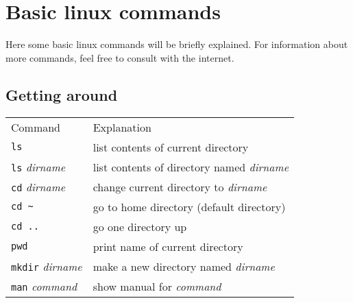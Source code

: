 \documentclass{article}
\begin{document}
\section{Basic linux commands}
Here some basic linux commands will be briefly explained.
For information about more commands, feel free to consult with the internet.

\subsection{Getting around}
\begin{tabular}{ll}
  Command & Explanation \\
  \hhline{==}
  \texttt{ls} & list contents of current directory \\
  \texttt{ls} \textit{dirname} & list contents of directory named \textit{dirname} \\
  \texttt{cd} \textit{dirname} & change current directory to \textit{dirname} \\
  \texttt{cd \textasciitilde} & go to home directory (default directory) \\
  \texttt{cd ..} & go one directory up \\
  \texttt{pwd} & print name of current directory \\
  \texttt{mkdir} \textit{dirname} & make a new directory named \textit{dirname}\\
  \texttt{man} \textit{command} & show manual for \textit{command} \\
\end{tabular}
\end{document}
